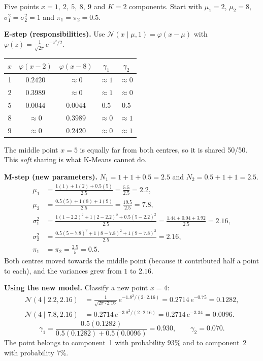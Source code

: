 \begin{example}
Five points $x=1,\ 2,\ 5,\ 8,\ 9$ and $K=2$ components. Start with $\mu_1=2$, $\mu_2=8$, $\sigma_1^2=\sigma_2^2=1$ and $\pi_1=\pi_2=0.5$.

\medskip
\textbf{E-step (responsibilities).} Use $\mathcal N(x\mid\mu,1)=\varphi(x-\mu)$ with $\varphi(z)=\frac1{\sqrt{2\pi}}e^{-z^2/2}$.
\begin{center}
\begin{tabular}{@{}c|cc|cc@{}}
\toprule
$x$ & $\varphi(x-2)$ & $\varphi(x-8)$ & $\gamma_{1}$ & $\gamma_{2}$\\
\midrule
1 & $0.2420$ & $\approx0$ & $\approx1$ & $\approx0$\\
2 & $0.3989$ & $\approx0$ & $\approx1$ & $\approx0$\\
5 & $0.0044$ & $0.0044$ & $\mathbf{0.5}$ & $\mathbf{0.5}$\\
8 & $\approx0$ & $0.3989$ & $\approx0$ & $\approx1$\\
9 & $\approx0$ & $0.2420$ & $\approx0$ & $\approx1$\\
\bottomrule
\end{tabular}
\end{center}
The middle point $x=5$ is equally far from both centres, so it is shared 50/50. This \emph{soft} sharing is what K-Means cannot do.

\medskip
\textbf{M-step (new parameters).} $N_1=1+1+0.5=2.5$ and $N_2=0.5+1+1=2.5$.
\begin{align*}
\mu_1&=\tfrac{1(1)+1(2)+0.5(5)}{2.5}=\tfrac{5.5}{2.5}=\mathbf{2.2},\\
\mu_2&=\tfrac{0.5(5)+1(8)+1(9)}{2.5}=\tfrac{19.5}{2.5}=\mathbf{7.8},\\
\sigma_1^2&=\tfrac{1(1-2.2)^2+1(2-2.2)^2+0.5(5-2.2)^2}{2.5}=\tfrac{1.44+0.04+3.92}{2.5}=\mathbf{2.16},\\
\sigma_2^2&=\tfrac{0.5(5-7.8)^2+1(8-7.8)^2+1(9-7.8)^2}{2.5}=\mathbf{2.16},\\
\pi_1&=\pi_2=\tfrac{2.5}{5}=\mathbf{0.5}.
\end{align*}
Both centres moved towards the middle point (because it contributed half a point to each), and the variances grew from $1$ to $2.16$.

\medskip
\textbf{Using the new model.} Classify a new point $x=4$:
\begin{align*}
  \mathcal N(4\mid2.2,2.16)&=\tfrac{1}{\sqrt{2\pi\cdot2.16}}\,e^{-1.8^2/(2\cdot2.16)}=0.2714\,e^{-0.75}=0.1282,\\
  \mathcal N(4\mid7.8,2.16)&=0.2714\,e^{-3.8^2/(2\cdot2.16)}=0.2714\,e^{-3.34}=0.0096 .
\end{align*}
\[
  \gamma_{1}=\frac{0.5(0.1282)}{0.5(0.1282)+0.5(0.0096)}=\mathbf{0.930},\qquad\gamma_2=0.070 .
\]
The point belongs to component~1 with probability $93\%$ and to component~2 with probability $7\%$.
\end{example}

